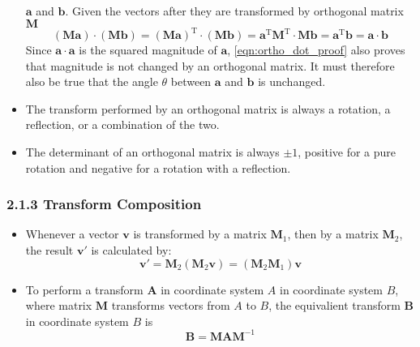 \documentclass[11pt]{article}
\newcommand{\bm}[1]{\mathbf{#1}}
\begin{document}
\begin{itemize}
            $\bm{a}$ and $\bm{b}$.  Given the vectors after they are
            transformed by orthogonal matrix $\bm{M}$
            \begin{equation}
                \left(\bm{M}\bm{a}\right) \cdot \left(\bm{M}\bm{b}\right) =
                \left(\bm{M}\bm{a}\right)^\text{T} \cdot \left(\bm{M}\bm{b}\right) =
                \bm{a}^\text{T}\bm{M}^\text{T} \cdot \bm{M}\bm{b} =
                \bm{a}^\text{T} \bm{b} = \bm{a} \cdot \bm{b}
                \label{eqn:ortho_dot_proof}
            \end{equation}
            Since $\bm{a} \cdot \bm{a}$ is the squared magnitude of $\bm{a}$,
            \eqref{eqn:ortho_dot_proof} also proves that magnitude is not
            changed by an orthogonal matrix.  It must therefore also be
            true that the angle $\theta$ between $\bm{a}$ and $\bm{b}$
            is unchanged.
        \item The transform performed by an orthogonal matrix is always
            a rotation, a reflection, or a combination of the two.
        \item The determinant of an orthogonal matrix is always $\pm 1$,
            positive for a pure rotation and negative for a rotation
            with a reflection.
    \end{itemize}

\subsubsection*{2.1.3 Transform Composition}
\begin{itemize}
    \item Whenever a vector $\bm{v}$ is transformed by a matrix $\bm{M}_1$, then
        by a matrix $\bm{M}_2$, the result $\bm{v}'$ is calculated by:
        \begin{equation}
            \bm{v}' = \bm{M}_2 \left( \bm{M}_2 \bm{v} \right)
            = \left( \bm{M}_2 \bm{M}_1 \right) \bm{v}
        \end{equation}
    \item To perform a transform $\bm{A}$ in coordinate system $A$ in coordinate
        system $B$, where matrix $\bm{M}$ transforms vectors from $A$ to $B$,
        the equivalient transform $\bm{B}$ in coordinate system $B$ is
        \begin{equation}
            \bm{B} = \bm{M} \bm{A} \bm{M}^{-1}
        \end{equation}
\end{itemize}
\end{document}

